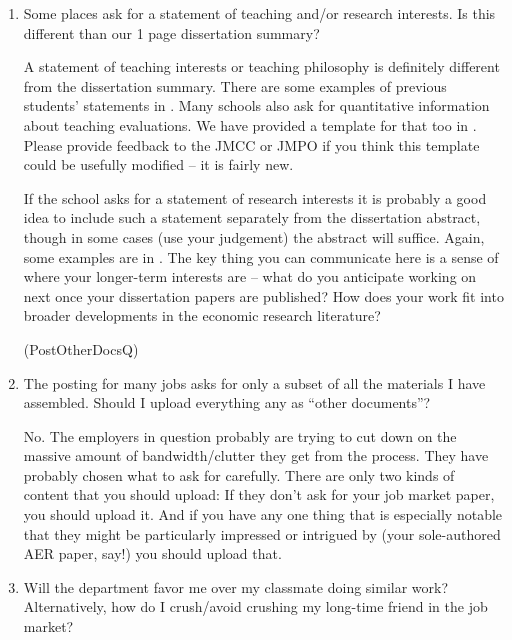 \documentclass{econtex}
\providecommand\phantomsection{}
\begin{document}
\begin{enumerate}
\item Some places ask for a statement of teaching and/or research
  interests.  Is this different than our 1 page
  dissertation summary?

  A statement of teaching interests or teaching philosophy is
  definitely different from the dissertation summary.  There are some
  examples of previous students' statements in \Resources.  Many
  schools also ask for quantitative information about teaching
  evaluations.  We have provided a template for that too in
  \Templates.  Please provide feedback to the JMCC or JMPO if you
  think this template could be usefully modified -- it is fairly new.

If the school asks for a statement of research interests it is probably
a good idea to include such a statement separately from the dissertation
abstract, though in some cases (use your judgement) the abstract will suffice.  Again, some examples are in \Resources.  
The key thing you can communicate here is a sense of where your longer-term 
interests are -- what do you anticipate working on next once your dissertation
papers are published?  How does your work fit into broader developments in 
the economic research literature?

\ifdvi\phantomsection\hypertarget{PostOtherDocsQ}{(PostOtherDocsQ)}\fi
\item The {\JOE} posting for many jobs asks for only a subset of all the materials I have assembled.  Should I upload everything any as ``other documents''?

  No. The employers in question probably are trying to cut down on the massive amount of bandwidth/clutter they get from the process.  They have probably chosen what to ask for carefully.  There are only two kinds of content that you should upload: If they don't ask for your job market paper, you should upload it. And if you have any one thing that is especially notable that they might be particularly impressed or intrigued by (your sole-authored AER paper, say!) you should upload that.

\item Will the department favor me over my classmate doing similar work?  Alternatively, how do I crush/avoid crushing my long-time friend in the job market?


\end{enumerate}
\end{document}
